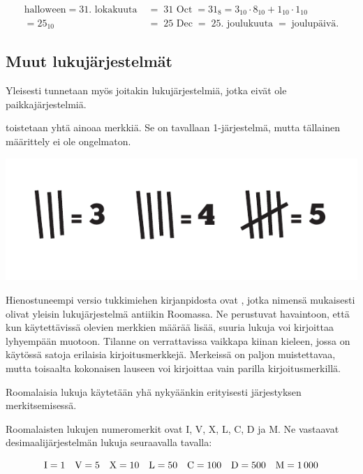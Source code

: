\begin{align*}
	\text{halloween} \; = \; \text{31. lokakuuta} \; &= \; \text{31 Oct} \; = 31_8 = 3_{10} \cdot 8_{10} + 1_{10} \cdot 1_{10} \\
	= {25}_{10} &= \; \text{25 Dec} \; = \; \text{25. joulukuuta} \; = \; \text{joulupäivä.}
\end{align*}

\subsection*{Muut lukujärjestelmät}

Yleisesti tunnetaan myös joitakin lukujärjestelmiä, jotka eivät ole paikkajärjestelmiä.

 toistetaan yhtä ainoaa merkkiä. Se on tavallaan 1-järjestelmä, mutta tällainen määrittely ei ole ongelmaton.

\begin{center}
	\includegraphics{pictures/Kuva1-1-tukkimiehenkirjanpito.pdf}
\end{center}

Hienostuneempi versio tukkimiehen kirjanpidosta ovat , jotka nimensä mukaisesti olivat yleisin lukujärjestelmä antiikin Roomassa.
Ne perustuvat havaintoon, että kun käytettävissä olevien merkkien määrää lisää, suuria lukuja voi kirjoittaa lyhyempään muotoon.
Tilanne on verrattavissa vaikkapa kiinan kieleen, jossa on käytössä satoja erilaisia kirjoitusmerkkejä.
Merkeissä on paljon muistettavaa, mutta toisaalta kokonaisen lauseen voi kirjoittaa vain parilla kirjoitusmerkillä.

Roomalaisia lukuja käytetään yhä nykyäänkin erityisesti järjestyksen merkitsemisessä.

Roomalaisten lukujen numeromerkit ovat I, V, X, L, C, D ja M. Ne vastaavat desimaalijärjestelmän lukuja seuraavalla tavalla:

\begin{equation*}
	\rm I=1\quad
	V=5\quad
	X=10\quad
	L=50\quad
	C=100\quad
	D=500\quad
	M=1\,000
\end{equation*}

